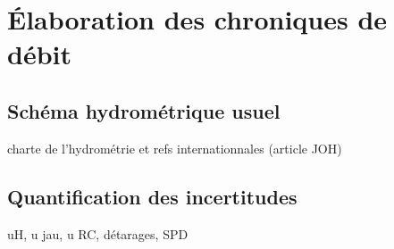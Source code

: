 \documentclass[11pt]{article}
\begin{document}
	
	

		

%
%






	    
	   
	    
\section{Élaboration des chroniques de débit}
		\subsection{Schéma hydrométrique usuel}
		charte de l'hydrométrie et refs internationnales (article JOH)
		\subsection{Quantification des incertitudes}
		uH, u jau, u RC, détarages, SPD
		
\end{document}
